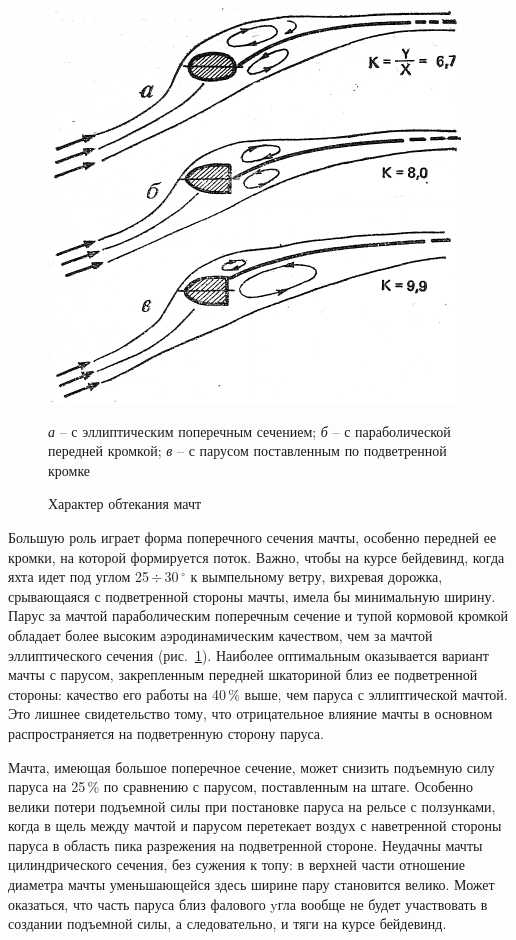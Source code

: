 \documentclass[a4paper, 12pt, twoside, final, book, russian, fittopage, cyremdash]{ncc}
\newcommand{\gr}{\ensuremath{\,^\circ}\xspace}
\newcommand{\otdo}{\,\ensuremath{\div}\,}
\newcommand{\ris}[1]{\ref{fig:#1}}
\begin{document}
\begin{figure}[htb]
  \centering
  \includegraphics[scale=1.2]{0025P}
  \caption{Характер обтекания мачт}
  \label{fig:25}
  \small
  \centering{}
  \textit{а} \--- с эллиптическим поперечным сечением; \textit{б} \--- с параболической передней кромкой; \textit{в} \--- с парусом поставленным по подветренной кромке
\end{figure}

Большую роль играет форма поперечного сечения мачты, особенно передней ее кромки, на которой формируется поток. Важно, чтобы на курсе бейдевинд, когда яхта идет под углом 25\otdo 30\gr к вымпельному ветру, вихревая дорожка, срывающаяся с подветренной стороны мачты, имела бы минимальную ширину. Парус за мачтой параболическим поперечным сечение и тупой кормовой кромкой обладает более высоким аэродинамическим качеством, чем за мачтой эллиптического сечения (рис.~\ris{25}). Наиболее оптимальным оказывается вариант мачты с парусом, закрепленным передней шкаториной близ ее подветренной стороны: качество его работы на 40\,\% выше, чем паруса с эллиптической мачтой. Это лишнее свидетельство тому, что отрицательное влияние мачты в основном распространяется на подветренную сторону паруса.

Мачта, имеющая большое поперечное сечение, может снизить подъемную силу паруса на 25\,\% по сравнению с парусом, поставленным на штаге. Особенно велики потери подъемной силы при постановке паруса на рельсе с ползунками, когда в щель между мачтой и парусом перетекает воздух с наветренной стороны паруса в область пика разрежения на подветренной стороне. Неудачны мачты цилиндрического сечения, без сужения к топу: в верхней части отношение диаметра мачты уменьшающейся здесь ширине пару становится велико. Может оказаться, что часть паруса близ фалового yгла вообще не будет участвовать в создании подъемной силы, а следовательно, и тяги на курсе бейдевинд.
\end{document}
